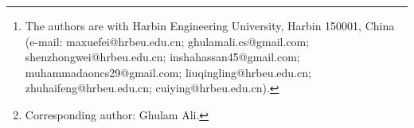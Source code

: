 \author{Xuefei~Ma,
        Ghulam~Ali,
        Zhongwei~Shen,
        Insha~Hassan,
        Muhammad~Aon,
        Qingling~Liu,
        Haifeng~Zhu,
        and~Ying~Cui%
\thanks{The authors are with Harbin Engineering University, Harbin
150001, China (e-mail: maxuefei@hrbeu.edu.cn;
ghulamali.cs@gmail.com; shenzhongwei@hrbeu.edu.cn;
inshahassan45@gmail.com; muhammadaoncs29@gmail.com;
liuqingling@hrbeu.edu.cn; zhuhaifeng@hrbeu.edu.cn;
cuiying@hrbeu.edu.cn).}%
\thanks{Corresponding author: Ghulam Ali.}}
